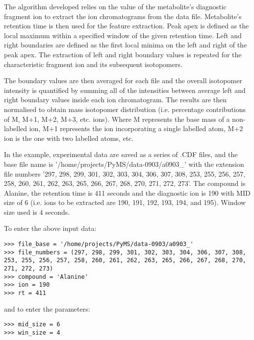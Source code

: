 The algorithm developed relies on the value of the metabolite’s diagnostic
fragment ion to extract the ion chromatograms from the data file.
Metabolite’s retention time is then used for the feature extraction. Peak
apex is defined as the local maximum within a specified window of the given
retention time. Left and right boundaries are defined as the first local minima on
the left and right of the peak apex. The extraction of left and right boundary
values is repeated for the characteristic fragment ion and its subsequent
isotopomers.

The boundary values are then averaged for each file and the overall isotopomer
intensity is quantified by summing all of the intensities between average left and
right boundary values inside each ion chromatogram. The results are
then normalised to obtain mass isotopomer distribution (i.e. percentage
contributions of M, M+1, M+2, M+3, etc. ions). Where M represents the base mass of 
a non-labelled ion, M+1 represents the ion incorporating a single labelled atom, 
M+2 ion is the one with two labelled atoms, etc.

In the example, experimental data are saved as a series of .CDF files, and the base 
file name is '/home/projects/PyMS/data-0903/a0903_' with the extension file numbers
'297, 298, 299, 301, 302, 303, 304, 306, 307, 308, 253, 255, 256, 257, 258, 260, 261, 
262, 263, 265, 266, 267, 268, 270, 271, 272, 273'. The compound is Alanine, the
retention time is 411 seconds and the diagnostic ion is 190 with MID size of 6 (i.e.
ions to be extracted are 190, 191, 192, 193, 194, and 195). Window size used is 4 
seconds.

To enter the above input data:

\begin{verbatim}
>>> file_base = '/home/projects/PyMS/data-0903/a0903_'
>>> file_numbers = (297, 298, 299, 301, 302, 303, 304, 306, 307, 308, 253, 255, 256, 257, 258, 260, 261, 262, 263, 265, 266, 267, 268, 270, 271, 272, 273)
>>> compound = 'Alanine'
>>> ion = 190
>>> rt = 411 
\end{verbatim}

and to enter the parameters:

\begin{verbatim} 
>>> mid_size = 6 
>>> win_size = 4 
\end{verbatim}

